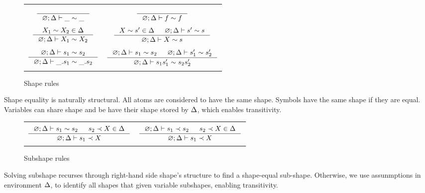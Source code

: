 \documentclass[english, mgr]{iithesis}
\newcommand{\solverRule}{\vdash}
\begin{document}
\begin{figure}[htbp]
    \centering
    \begin{tabularx}{\textwidth}{|CC|}
      \hline & \\ $
      \inference{
      }{
        \emptyenv ; \icEnv \solverRule \shatom \csheq \shatom
      }
      $ & $
      \inference{
      }{
        \emptyenv ; \icEnv \solverRule \symb \csheq \symb
      }
      $ \\ & \\
      $
      \inference{
        \termv_1 \csheq \termv_2 \in \icEnv
      }{
        \emptyenv ; \icEnv \solverRule \termv_1 \csheq \termv_2
      }
      $ & $
      \inference{
        \termv  \csheq \shape' \in \icEnv
        &
        \emptyenv ; \icEnv \solverRule \shape'  \csheq \shape
      }{
        \emptyenv ; \icEnv \solverRule \termv  \csheq \shape
      }
      $ \\ & \\
      $\inference{
        \emptyenv ; \icEnv \solverRule \shape_1 \csheq \shape_2
      }{
        \emptyenv ; \icEnv \solverRule \shbind \shape_1 \csheq \shbind \shape_2
      }
      $ & $
      \inference{
        \emptyenv ; \icEnv \solverRule \shape_1 \csheq \shape_2
        &
        \emptyenv ; \icEnv \solverRule \shape_1' \csheq \shape_2'
      }{
        \emptyenv ; \icEnv \solverRule \shape_1 \shape_1' \csheq \shape_2 \shape_2'
      }
      $ \\ & \\ \hline
      \end{tabularx}
  \caption{Shape rules}
  \label{fig:shape-rules}
\end{figure}
Shape equality is naturally structural.
All atoms are considered to have the same shape.
Symbols have the same shape if they are equal.
Variables can share shape and be have their shape stored by $\Delta$,
which enables transitivity.

\begin{figure}[htbp]
    \centering
    \begin{tabularx}{\textwidth}{|CC|}
      \hline & \\ $
      \inference{
        \emptyenv ; \icEnv \solverRule \shape_1 \csheq \shape_2
        &
        \shape_2 \cshlt \termv \in \icEnv
      }{
        \emptyenv ; \icEnv \solverRule \shape_1 \cshlt \termv
      }
      $ & $
      \inference{
        \emptyenv ; \icEnv \solverRule \shape_1 \cshlt \shape_2
        &
        \shape_2 \cshlt \termv \in \icEnv
      }{
        \emptyenv ; \icEnv \solverRule \shape_1 \cshlt \termv
      }
      $ \\ & \\ \hline
      \end{tabularx}
  \caption{Subshape rules}
  \label{fig:subshape-rules}
\end{figure}
Solving subshape recurses through right-hand side shape's structure to find a shape-equal sub-shape.
Otherwise, we use assunmptions in environment $\Delta$, to identify all shapes that given variable subshapes,
enabling transitivity.
\end{document}
